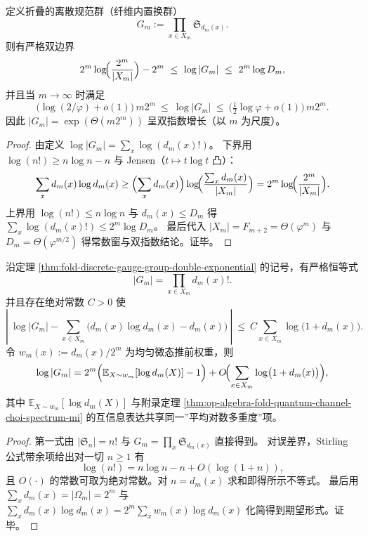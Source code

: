 \begin{theorem}[离散规范群的双指数律]\label{thm:fold-discrete-gauge-group-double-exponential}
定义折叠的离散规范群（纤维内置换群）
\[
G_m:=\prod_{x\in X_m}\mathfrak S_{d_m(x)}.
\]
则有严格双边界
\[
2^m\log\!\Bigl(\frac{2^m}{|X_m|}\Bigr)-2^m
\ \le\
\log|G_m|
\ \le\
2^m\log D_m,
\]
并且当 \(m\to\infty\) 时满足
\[
\bigl(\log(2/\varphi)+o(1)\bigr)\,m2^m
\ \le\
\log|G_m|
\ \le\
\bigl(\tfrac12\log\varphi+o(1)\bigr)\,m2^m.
\]
因此
\(
|G_m|=\exp(\Theta(m2^m))
\)
呈双指数增长（以 \(m\) 为尺度）。
\end{theorem}
\begin{proof}
由定义 \(\log|G_m|=\sum_x \log(d_m(x)!)\)。
下界用 \(\log(n!)\ge n\log n-n\) 与 Jensen（\(t\mapsto t\log t\) 凸）：
\[
\sum_x d_m(x)\log d_m(x)
\ge
\Bigl(\sum_x d_m(x)\Bigr)\log\!\Bigl(\frac{\sum_x d_m(x)}{|X_m|}\Bigr)
=2^m\log\!\Bigl(\frac{2^m}{|X_m|}\Bigr).
\]
上界用 \(\log(n!)\le n\log n\) 与 \(d_m(x)\le D_m\) 得 \(\sum_x \log(d_m(x)!)\le 2^m\log D_m\)。
最后代入 \(|X_m|=F_{m+2}=\Theta(\varphi^m)\) 与 \(D_m=\Theta(\varphi^{m/2})\) 得常数窗与双指数结论。证毕。
\end{proof}

\begin{corollary}[离散规范群的 Stirling 主项与平均对数多重度]\label{cor:fold-discrete-gauge-group-stirling-coupling}
沿定理 \ref{thm:fold-discrete-gauge-group-double-exponential} 的记号，有严格恒等式
\[
|G_m|=\prod_{x\in X_m} d_m(x)! .
\]
并且存在绝对常数 \(C>0\) 使
\[
\left|\ \log|G_m|-\sum_{x\in X_m}\bigl(d_m(x)\log d_m(x)-d_m(x)\bigr)\ \right|
\ \le\ C\sum_{x\in X_m}\log\bigl(1+d_m(x)\bigr).
\]
令 \(w_m(x):=d_m(x)/2^m\) 为均匀微态推前权重，则
\[
\log|G_m|
=2^m\Bigl(\mathbb{E}_{X\sim w_m}[\log d_m(X)]-1\Bigr)
+O\!\Bigl(\sum_{x\in X_m}\log\bigl(1+d_m(x)\bigr)\Bigr),
\]
其中 \(\mathbb{E}_{X\sim w_m}[\log d_m(X)]\) 与附录定理 \ref{thm:op-algebra-fold-quantum-channel-choi-spectrum-mi} 的互信息表达共享同一”平均对数多重度”项。
\end{corollary}
\begin{proof}
第一式由 \(|\mathfrak S_n|=n!\) 与 \(G_m=\prod_x\mathfrak S_{d_m(x)}\) 直接得到。
对误差界，Stirling 公式带余项给出对一切 \(n\ge 1\) 有
\[
\log(n!)=n\log n-n+O(\log(1+n)),
\]
且 \(O(\cdot)\) 的常数可取为绝对常数。对 \(n=d_m(x)\) 求和即得所示不等式。
最后用 \(\sum_x d_m(x)=|\Omega_m|=2^m\) 与
\(
\sum_x d_m(x)\log d_m(x)=2^m\sum_x w_m(x)\log d_m(x)
\)
化简得到期望形式。证毕。
\end{proof}

